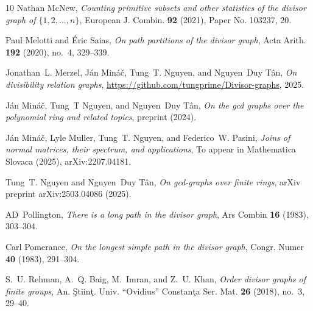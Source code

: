 \documentclass[11pt,a4paper]{amsart}
\theoremstyle{definition}
\numberwithin{equation}{section}
\begin{document}
\begin{thebibliography}{10}
Nathan McNew, \emph{Counting primitive subsets and other statistics of the divisor graph of {$\{1,2,\dots,n\}$}}, European J. Combin. \textbf{92} (2021), Paper No. 103237, 20. 

Paul Melotti and \'{E}ric Saias, \emph{On path partitions of the divisor graph}, Acta Arith. \textbf{192} (2020), no.~4, 329--339. 

Jonathan~L. Merzel, J\'an Min\'a\v{c}, Tung~T. Nguyen, and Nguyen~Duy T\^{a}n, \emph{On divisibility relation graphs}, \url{https://github.com/tungprime/Divisor-graphs}, 2025.

J{\'a}n Min{\'a}{\v{c}}, Tung~T Nguyen, and Nguyen~Duy T{\^a}n, \emph{On the gcd graphs over the polynomial ring and related topics}, preprint (2024).

J{\'a}n {Min{\'a}{\v{c}}}, Lyle {Muller}, Tung~T. {Nguyen}, and Federico~W. {Pasini}, \emph{{Joins of normal matrices, their spectrum, and applications}}, To appear in Mathematica Slovaca (2025), arXiv:2207.04181.

Tung~T. Nguyen and Nguyen~Duy T{\^a}n, \emph{On gcd-graphs over finite rings}, arXiv preprint arXiv:2503.04086 (2025).

AD~Pollington, \emph{There is a long path in the divisor graph}, Ars Combin \textbf{16} (1983), 303--304.

Carl Pomerance, \emph{On the longest simple path in the divisor graph}, Congr. Numer \textbf{40} (1983), 291--304.

S.~U. Rehman, A.~Q. Baig, M.~Imran, and Z.~U. Khan, \emph{Order divisor graphs of finite groups}, An. \c Stiin\c t. Univ. ``Ovidius'' Constan\c ta Ser. Mat. \textbf{26} (2018), no.~3, 29--40. 

\end{thebibliography}




%
%
 
\end{document}
